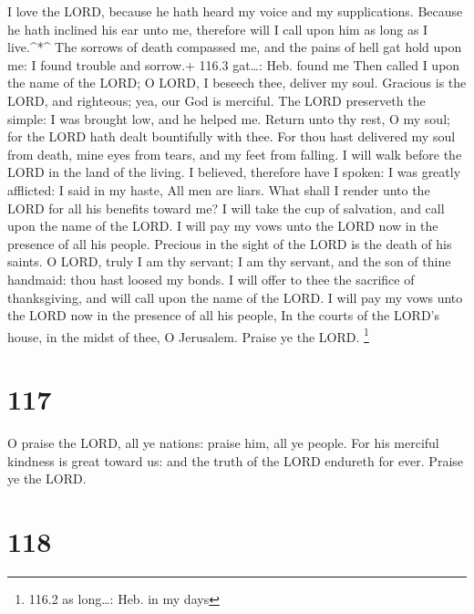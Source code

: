  I love the LORD, because he hath heard my voice and my
supplications.  Because he hath inclined his ear unto me,
therefore will I call upon him as long as I live.\^{}*\^{} 
The sorrows of death compassed me, and the pains of hell gat hold upon
me: I found trouble and sorrow.+ 116.3 gat\ldots: Heb. found me
 Then called I upon the name of the LORD; O LORD, I beseech
thee, deliver my soul.  Gracious is the LORD, and righteous;
yea, our God is merciful.  The LORD preserveth the simple: I
was brought low, and he helped me.  Return unto thy rest, O
my soul; for the LORD hath dealt bountifully with thee.  For
thou hast delivered my soul from death, mine eyes from tears, and my
feet from falling.  I will walk before the LORD in the land
of the living.  I believed, therefore have I spoken: I was
greatly afflicted:  I said in my haste, All men are liars.
 What shall I render unto the LORD for all his benefits
toward me?  I will take the cup of salvation, and call upon
the name of the LORD.  I will pay my vows unto the LORD now
in the presence of all his people.  Precious in the sight
of the LORD is the death of his saints.  O LORD, truly I am
thy servant; I am thy servant, and the son of thine handmaid: thou hast
loosed my bonds.  I will offer to thee the sacrifice of
thanksgiving, and will call upon the name of the LORD.  I
will pay my vows unto the LORD now in the presence of all his people,
 In the courts of the LORD's house, in the midst of thee, O
Jerusalem. Praise ye the LORD. \footnote{116.2 as long\ldots: Heb. in my
  days}

\hypertarget{section-116}{%
\section{117}\label{section-116}}

 O praise the LORD, all ye nations: praise him, all ye
people.  For his merciful kindness is great toward us: and
the truth of the LORD endureth for ever. Praise ye the LORD.

\hypertarget{section-117}{%
\section{118}\label{section-117}}

